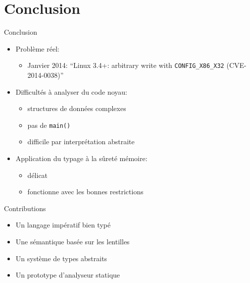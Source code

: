 \section{Conclusion}

\begin{frame}{Conclusion}
    \begin{itemize}
    \item Problème réel:
        \begin{itemize}
            \item Janvier 2014:
                \enquote{Linux 3.4+: arbitrary write with \texttt{CONFIG\_X86\_X32} (CVE-2014-0038)}
        \end{itemize}
    \item Difficultés à analyser du code noyau:
        \begin{itemize}
            \item structures de données complexes
            \item pas de \texttt{main()}
            \item difficile par interprétation abstraite
        \end{itemize}
    \item Application du typage à la sûreté mémoire:
        \begin{itemize}
            \item délicat
            \item fonctionne avec les bonnes restrictions
        \end{itemize}
    \end{itemize}
\end{frame}

\begin{frame}{Contributions}
\begin{itemize}
\item Un langage impératif bien typé
\item Une sémantique basée sur les lentilles
\item Un système de types abstraits
\item Un prototype d'analyseur statique
\end{itemize}
\end{frame}

